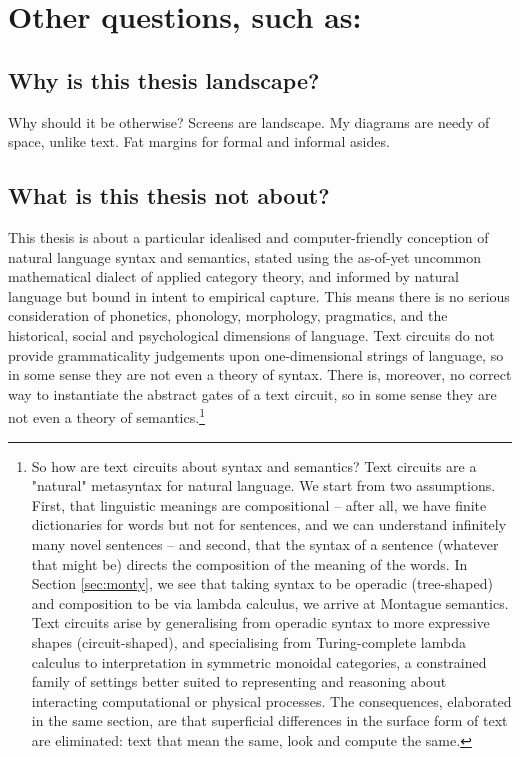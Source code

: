 \section{Other questions, such as:}
\subsection{Why is this thesis landscape?} Why should it be otherwise? Screens are landscape. My diagrams are needy of space, unlike text. Fat margins for formal and informal asides.

\subsection{What is this thesis not about?}

This thesis is about a particular idealised and computer-friendly conception of natural language syntax and semantics, stated using the as-of-yet uncommon mathematical dialect of applied category theory, and informed by natural language but bound in intent to empirical capture. This means there is no serious consideration of phonetics, phonology, morphology, pragmatics, and the historical, social and psychological dimensions of language. Text circuits do not provide grammaticality judgements upon one-dimensional strings of language, so in some sense they are not even a theory of syntax. There is, moreover, no correct way to instantiate the abstract gates of a text circuit, so in some sense they are not even a theory of semantics.\footnote{
So how are text circuits about syntax and semantics? Text circuits are a "natural" metasyntax for natural language. We start from two assumptions. First, that linguistic meanings are compositional -- after all, we have finite dictionaries for words but not for sentences, and we can understand infinitely many novel sentences -- and second, that the syntax of a sentence (whatever that might be) directs the composition of the meaning of the words. In Section \ref{sec:monty}, we see that taking syntax to be operadic (tree-shaped) and composition to be via lambda calculus, we arrive at Montague semantics. Text circuits arise by generalising from operadic syntax to more expressive shapes (circuit-shaped), and specialising from Turing-complete lambda calculus to interpretation in symmetric monoidal categories, a constrained family of settings better suited to representing and reasoning about interacting computational or physical processes. The consequences, elaborated in the same section, are that superficial differences in the surface form of text are eliminated: text that mean the same, look and compute the same.
}\\

